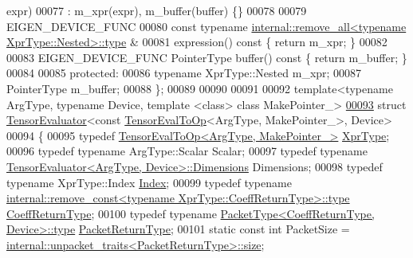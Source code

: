 \begin{DoxyCode}
      expr)
00077       : m\_xpr(expr), m\_buffer(buffer) \{\}
00078 
00079     EIGEN\_DEVICE\_FUNC
00080     \textcolor{keyword}{const} \textcolor{keyword}{typename} \hyperlink{group___sparse_core___module}{internal::remove\_all<typename XprType::Nested>::type}
      &
00081     expression()\textcolor{keyword}{ const }\{ \textcolor{keywordflow}{return} m\_xpr; \}
00082 
00083     EIGEN\_DEVICE\_FUNC PointerType buffer()\textcolor{keyword}{ const }\{ \textcolor{keywordflow}{return} m\_buffer; \}
00084 
00085   \textcolor{keyword}{protected}:
00086     \textcolor{keyword}{typename} XprType::Nested m\_xpr;
00087     PointerType m\_buffer;
00088 \};
00089 
00090 
00091 
00092 \textcolor{keyword}{template}<\textcolor{keyword}{typename} ArgType, \textcolor{keyword}{typename} Device, \textcolor{keyword}{template} <\textcolor{keyword}{class}> \textcolor{keyword}{class }MakePointer\_>
\hyperlink{struct_eigen_1_1_tensor_evaluator_3_01const_01_tensor_eval_to_op_3_01_arg_type_00_01_make_pointer___01_4_00_01_device_01_4}{00093} \textcolor{keyword}{struct }\hyperlink{struct_eigen_1_1_tensor_evaluator}{TensorEvaluator}<const \hyperlink{class_eigen_1_1_tensor_eval_to_op}{TensorEvalToOp}<ArgType, MakePointer\_>, Device>
00094 \{
00095   \textcolor{keyword}{typedef} \hyperlink{class_eigen_1_1_tensor_eval_to_op}{TensorEvalToOp<ArgType, MakePointer\_>} 
      \hyperlink{class_eigen_1_1_tensor_eval_to_op}{XprType};
00096   \textcolor{keyword}{typedef} \textcolor{keyword}{typename} ArgType::Scalar Scalar;
00097   \textcolor{keyword}{typedef} \textcolor{keyword}{typename} \hyperlink{struct_eigen_1_1_tensor_evaluator}{TensorEvaluator<ArgType, Device>::Dimensions}
       Dimensions;
00098   \textcolor{keyword}{typedef} \textcolor{keyword}{typename} XprType::Index \hyperlink{namespace_eigen_a62e77e0933482dafde8fe197d9a2cfde}{Index};
00099   \textcolor{keyword}{typedef} \textcolor{keyword}{typename} 
      \hyperlink{group___sparse_core___module}{internal::remove\_const<typename XprType::CoeffReturnType>::type}
       \hyperlink{group___sparse_core___module}{CoeffReturnType};
00100   \textcolor{keyword}{typedef} \textcolor{keyword}{typename} \hyperlink{group___sparse_core___module}{PacketType<CoeffReturnType, Device>::type} 
      \hyperlink{group___sparse_core___module}{PacketReturnType};
00101   \textcolor{keyword}{static} \textcolor{keyword}{const} \textcolor{keywordtype}{int} PacketSize = 
      \hyperlink{struct_eigen_1_1internal_1_1unpacket__traits}{internal::unpacket\_traits<PacketReturnType>::size};

\end{DoxyCode}
